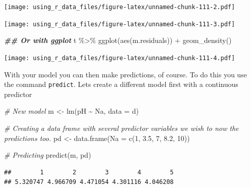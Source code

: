 \documentclass[
]{book}
\newenvironment{Shaded}{\begin{snugshade}}{\end{snugshade}}
\newcommand{\AttributeTok}[1]{\textcolor[rgb]{0.77,0.63,0.00}{#1}}
\newcommand{\CommentTok}[1]{\textcolor[rgb]{0.56,0.35,0.01}{\textit{#1}}}
\newcommand{\DecValTok}[1]{\textcolor[rgb]{0.00,0.00,0.81}{#1}}
\newcommand{\DocumentationTok}[1]{\textcolor[rgb]{0.56,0.35,0.01}{\textbf{\textit{#1}}}}
\newcommand{\FloatTok}[1]{\textcolor[rgb]{0.00,0.00,0.81}{#1}}
\newcommand{\FunctionTok}[1]{\textcolor[rgb]{0.00,0.00,0.00}{#1}}
\newcommand{\NormalTok}[1]{#1}
\newcommand{\OtherTok}[1]{\textcolor[rgb]{0.56,0.35,0.01}{#1}}
\newcommand{\SpecialCharTok}[1]{\textcolor[rgb]{0.00,0.00,0.00}{#1}}
\begin{document}
\texttt{[image: using\_r\_data\_files/figure-latex/unnamed-chunk-111-2.pdf]}

\begin{Shaded}
\end{Shaded}

\texttt{[image: using\_r\_data\_files/figure-latex/unnamed-chunk-111-3.pdf]}

\begin{Shaded}
\begin{Highlighting}[]
\DocumentationTok{\#\# Or with ggplot}
\NormalTok{t }\SpecialCharTok{\%\textgreater{}\%} 
  \FunctionTok{ggplot}\NormalTok{(}\FunctionTok{aes}\NormalTok{(m.residuals)) }\SpecialCharTok{+}
  \FunctionTok{geom\_density}\NormalTok{()}
\end{Highlighting}
\end{Shaded}

\texttt{[image: using\_r\_data\_files/figure-latex/unnamed-chunk-111-4.pdf]}

With your model you can then make predictions, of course. To do this you use the command \texttt{predict}. Lets create a different model first with a continuous predictor

\begin{Shaded}
\begin{Highlighting}[]
\CommentTok{\# New model}
\NormalTok{m }\OtherTok{\textless{}{-}} \FunctionTok{lm}\NormalTok{(pH }\SpecialCharTok{\textasciitilde{}}\NormalTok{ Na, }\AttributeTok{data =}\NormalTok{ d)}

\CommentTok{\# Creating a data frame with several predictor variables we wish to now the predictions too.}
\NormalTok{pd }\OtherTok{\textless{}{-}} \FunctionTok{data.frame}\NormalTok{(}\AttributeTok{Na =} \FunctionTok{c}\NormalTok{(}\DecValTok{1}\NormalTok{, }\FloatTok{3.5}\NormalTok{, }\DecValTok{7}\NormalTok{, }\FloatTok{8.2}\NormalTok{, }\DecValTok{10}\NormalTok{))}

\CommentTok{\# Predicting}
\FunctionTok{predict}\NormalTok{(m, pd)}
\end{Highlighting}
\end{Shaded}

\begin{verbatim}
##        1        2        3        4        5 
## 5.320747 4.966709 4.471054 4.301116 4.046208
\end{verbatim}
\end{document}
